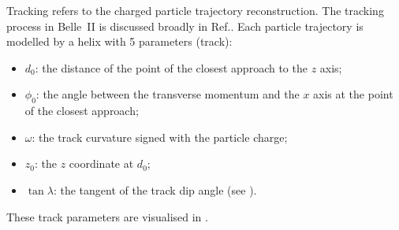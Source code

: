 Tracking refers to the charged particle trajectory reconstruction.
The tracking process in Belle~II is discussed broadly in Ref.\cite{BelleIITrackingGroup:2020hpx}.
Each particle trajectory is modelled by a helix with 5 parameters (track):
\begin{itemize}
    \item $d_0$: the distance of the point of the closest approach to the $z$ axis;
    \item $\phi_0$: the angle between the transverse momentum and the $x$ axis at the point of the closest approach;
    \item $\omega$: the track curvature signed with the particle charge;
    \item $z_0$: the $z$ coordinate at $d_0$;
    \item $\tan\lambda$: the tangent of the track dip angle (see ).
\end{itemize}
These track parameters are visualised in .
